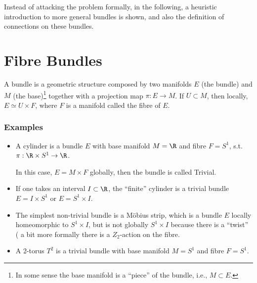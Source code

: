 Instead of attacking the problem formally, in the following, a heuristic introduction to more general bundles is shown, and also the definition of connections on these bundles.

\section{Fibre Bundles}

A bundle is a geometric structure composed by two manifolds $E$ (the bundle) and $M$ (the base)\footnote{In some sense the base manifold is a ``piece'' of the bundle, i.e., $M\subset E$.} together with a projection map $\pi:E\to M$. If $U\subset M$, then locally, $E\simeq U\times F$, where $F$ is a manifold called the fibre of $E$. 

\subsubsection*{Examples}
\begin{itemize}
\item A cylinder is a bundle $E$ with base manifold $M=\R$ and fibre $F=S^1$, s.t. $\pi:\R\times S^1\to \R$.
  
  In this case, $E=M\times F$ globally, then the bundle is called {\sc Trivial}.
\item If one takes an interval $I\subset \R$, the ``finite'' cylinder is a trivial bundle $E=I\times S^1$ or $E=S^1\times I$.
\item The simplest non-trivial bundle is a M\"obius strip, which is a bundle $E$ locally homeomorphic to $S^1\times I$, but is not globally $S^1\times I$ because there is a ``twist'' ( a bit more formally there is a $Z_2$-action on the fibre.
  \begin{center}
  \end{center}
\item  A 2-torus $T^2$ is a trivial bundle with base manifold $M=S^1$ and fibre $F=S^1$.
\end{itemize}


